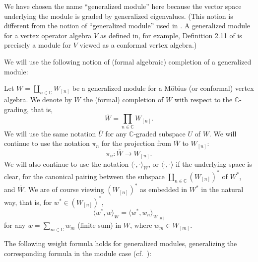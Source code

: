\documentclass[12pt]{article}
\begin{document}
\begin{rema}{\rm
We have chosen the name ``generalized module'' here because the vector
space underlying the module is graded by generalized
eigenvalues. (This notion is different {}from the notion of
``generalized module'' used in \cite{tensor1}. A generalized module
for a vertex operator algebra $V$ as defined in, for example,
Definition 2.11 of \cite{tensor1} is precisely a module for $V$ viewed
as a conformal vertex algebra.)  }
\end{rema}

We will use the following notion of (formal algebraic) completion of a
generalized module:

\begin{defi}\label{Wbardef}{\rm
Let $W=\coprod_{n\in{\mathbb C}}W_{[n]}$ be a generalized module for a
M\"obius (or conformal) vertex algebra. We denote by $\overline{W}$
the (formal) completion of $W$ with respect to the ${\mathbb
C}$-grading, that is,
\begin{equation}\label{Wbar}
\overline{W}=\prod _{n\in {\mathbb C}} W_{[n]}.
\end{equation}
We will use the same notation $\overline{U}$ for any ${\mathbb
C}$-graded subspace $U$ of $W$.  We will continue to use the notation
$\pi_n$ for the projection {}from $\overline{W}$ to $W_{[n]}$:
\[
\pi_n: \overline{W} \to W_{[n]}.
\]
We will also continue to use the notation
$\langle\cdot,\cdot\rangle_W$, or $\langle\cdot,\cdot\rangle$ if the
underlying space is clear, for the canonical pairing between the
subspace $\coprod _{n\in {\mathbb C}} (W_{[n]})^*$ of $W^*$, and
$\overline{W}$.  We are of course viewing $(W_{[n]})^*$ as embedded in
$W^*$ in the natural way, that is, for $w^*\in (W_{[n]})^*$,
\begin{equation}\label{Wnstar}
\langle w^*, w\rangle_W=\langle w^*, w_n\rangle_{W_{[n]}}
\end{equation}
for any $w=\sum_{m\in {\mathbb C}} w_m$ (finite sum) in $W$, where
$w_m\in W_{[m]}$.}
\end{defi}

The following weight formula holds for generalized modules,
generalizing the corresponding formula in the module case
(cf.\ \cite{Mi}):
\end{document}
